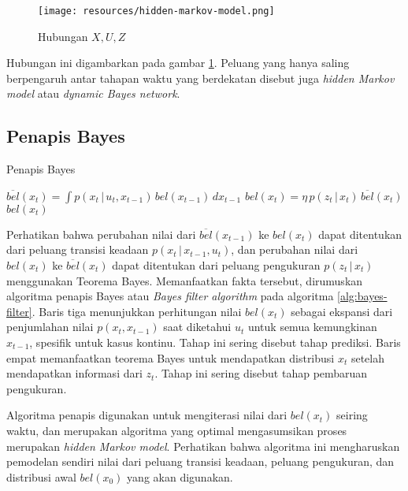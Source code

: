 \begin{figure}[h]
    \centering
    \texttt{[image: resources/hidden-markov-model.png]}
    \caption{Hubungan $X, U, Z$}
    \label{fig:hidden-markov-model}
\end{figure}

Hubungan ini digambarkan pada gambar \ref{fig:hidden-markov-model}. Peluang yang hanya saling berpengaruh antar tahapan waktu yang berdekatan disebut juga \textit{hidden Markov model} atau \textit{dynamic Bayes network}.

\subsection{Penapis Bayes}

\begin{algorithm}
    \caption{Penapis Bayes}
    \label{alg:bayes-filter}
    \begin{algorithmic}[1]
        \State $\overline{bel}(x_t) = \int p(x_t \,|\, u_t, x_{t-1})\, bel(x_{t-1})\, dx_{t-1}$
        \State $bel(x_t) = \eta\, p(z_t \,|\, x_t)\, \overline{bel}(x_t)$ 
        \EndFor
        \State \Return $bel(x_t)$
        \EndFunction
    \end{algorithmic}
\end{algorithm}

Perhatikan bahwa perubahan nilai dari $\overline{bel}(x_{t-1})$ ke $bel(x_t)$ dapat ditentukan dari peluang transisi keadaan $p(x_t \,|\, x_{t-1}, u_t)$, dan perubahan nilai dari $bel(x_t)$ ke $\overline{bel}(x_t)$ dapat ditentukan dari peluang pengukuran $p(z_t \,|\, x_t)$ menggunakan Teorema Bayes. Memanfaatkan fakta tersebut, dirumuskan algoritma penapis Bayes atau \textit{Bayes filter algorithm} pada algoritma \ref{alg:bayes-filter}. Baris tiga menunjukkan perhitungan nilai $bel(x_t)$ sebagai ekspansi dari penjumlahan nilai $p(x_t, x_{t-1})$ saat diketahui $u_t$ untuk semua kemungkinan $x_{t-1}$, spesifik untuk kasus kontinu. Tahap ini sering disebut tahap prediksi. Baris empat memanfaatkan teorema Bayes untuk mendapatkan distribusi $x_t$ setelah mendapatkan informasi dari $z_t$. Tahap ini sering disebut tahap pembaruan pengukuran.

Algoritma penapis digunakan untuk mengiterasi nilai dari $bel(x_t)$ seiring waktu, dan merupakan algoritma yang optimal mengasumsikan proses merupakan \textit{hidden Markov model}. Perhatikan bahwa algoritma ini mengharuskan pemodelan sendiri nilai dari peluang transisi keadaan, peluang pengukuran, dan distribusi awal $bel(x_0)$ yang akan digunakan.

